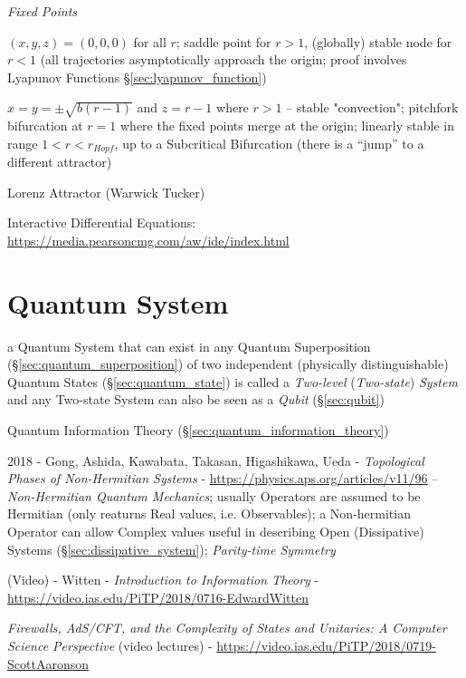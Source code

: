 \emph{Fixed Points}

$(x,y,z) = (0,0,0)$ for all $r$; saddle point for $r > 1$, (globally) stable
node for $r < 1$ (all trajectories asymptotically approach the origin; proof
involves Lyapunov Functions \S\ref{sec:lyapunov_function})

$x = y = \pm\sqrt{b(r-1)}$ and $z = r-1$ where $r > 1$ -- stable "convection";
pitchfork bifurcation at $r=1$ where the fixed points merge at the origin;
linearly stable in range $1 < r < r_{Hopf}$, up to a Subcritical Bifurcation
(there is a ``jump'' to a different attractor)

Lorenz Attractor (Warwick Tucker)

Interactive Differential Equations:
\url{https://media.pearsoncmg.com/aw/ide/index.html}



\section{Quantum System}\label{sec:quantum_system}


a Quantum System that can exist in any Quantum Superposition
(\S\ref{sec:quantum_superposition}) of two independent (physically
distinguishable) Quantum States (\S\ref{sec:quantum_state}) is called a
\emph{Two-level} (\emph{Two-state}) \emph{System} and any Two-state System can
also be seen as a \emph{Qubit} (\S\ref{sec:qubit})

Quantum Information Theory (\S\ref{sec:quantum_information_theory})

2018 - Gong, Ashida, Kawabata, Takasan, Higashikawa, Ueda -
\emph{Topological Phases of Non-Hermitian Systems} -
\url{https://physics.aps.org/articles/v11/96} -- \emph{Non-Hermitian Quantum
  Mechanics}; usually Operators are assumed to be Hermitian (only reaturns Real
values, i.e. Observables); a Non-hermitian Operator can allow Complex values
useful in describing Open (Dissipative) Systems
(\S\ref{sec:dissipative_system}); \emph{Parity-time Symmetry}

(Video) - Witten - \emph{Introduction to Information Theory} -
\url{https://video.ias.edu/PiTP/2018/0716-EdwardWitten}

\asterism

\emph{Firewalls, AdS/CFT, and the Complexity of States and Unitaries: A Computer
  Science Perspective}
(video lectures)
-
\url{https://video.ias.edu/PiTP/2018/0719-ScottAaronson}

